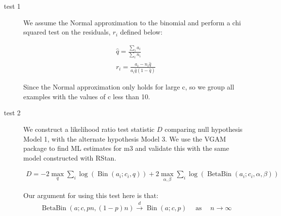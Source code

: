 \documentclass[11pt,a4,singlespacing,titlepagenumber=on]{scrreprt}
\numberwithin{equation}{chapter} %
\theoremstyle{remark}
\begin{document}
\begin{description}
	\item[test 1] 

We assume the Normal approximation to the binomial and perform a chi squared test on the residuals, $r_i$ defined below:

\begin{align}
	\hat{q} = \frac{ \sum_{i} a_i }{ \sum_{i} n_i } \\
	r_i = \frac{ a_i - n_i \hat{q} }{ a_i \hat{q} (1 - \hat{q}) }
\end{align}

Since the Normal approximation only holds for large c, so we group all examples with the values of c less than 10.


%
%


	\item[test 2] 

We construct a likelihood ratio test statistic $D$ comparing null hypothesis Model 1, with the alternate hypothesis Model 3. We use the VGAM package to find ML estimates for m3 and validate this with the same model constructed with RStan. 

\begin{align}
	D = -2 \max_{q} \sum_i \log( \operatorname{Bin}(a_i;c_i,q) ) +
	2 \max_{\alpha,\beta} \sum_i \log( \operatorname{BetaBin}(a_i;c_i,\alpha,\beta) ) 
\end{align}

Our argument for using this test here is that:
\begin{align}
	 \operatorname{BetaBin}(a;c,pn,(1-p)n) \overset{d}{\to} \operatorname{Bin}(a;c,p) \quad \operatorname{as} \quad n \to \infty
\end{align}

%



\end{description}
\end{document}

